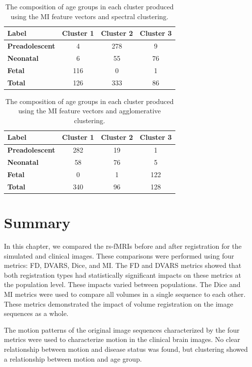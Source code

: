 \begin{table}
\centering
\caption{The composition of age groups in each cluster produced using the MI feature vectors and spectral clustering.}
\label{tab:mocha-mi-spectral}
\begin{tabular}{|l|c|c|c|}
\hline
\textbf{Label} & \multicolumn{1}{l|}{\textbf{Cluster 1}} & \multicolumn{1}{l|}{\textbf{Cluster 2}} & \multicolumn{1}{l|}{\textbf{Cluster 3}} \\ \hline
\textbf{Preadolescent} &   4 & 278 &  9 \\ \hline
\textbf{Neonatal}      &   6 &  55 & 76 \\ \hline
\textbf{Fetal}         & 116 &   0 &  1 \\ \hline
\textbf{Total}         & 126 & 333 & 86 \\ \hline
\end{tabular}
\end{table}

\begin{table}
\centering
\caption{The composition of age groups in each cluster produced using the MI feature vectors and agglomerative clustering.}
\label{tab:mocha-mi-agg}
\begin{tabular}{|l|c|c|c|}
\hline
\textbf{Label} & \multicolumn{1}{l|}{\textbf{Cluster 1}} & \multicolumn{1}{l|}{\textbf{Cluster 2}} & \multicolumn{1}{l|}{\textbf{Cluster 3}} \\ \hline
\textbf{Preadolescent} & 282 & 19 & 1   \\ \hline
\textbf{Neonatal}      & 58  & 76 & 5   \\ \hline
\textbf{Fetal}         & 0   & 1  & 122 \\ \hline
\textbf{Total}         & 340 & 96 & 128 \\ \hline
\end{tabular}
\end{table}

\clearpage

\section{Summary}

In this chapter, we compared the rs-fMRIs before and after registration for the simulated and clinical images. These comparisons were performed using four metrics: FD, DVARS, Dice, and MI. The FD and DVARS metrics showed that both registration types had statistically significant impacts on these metrics at the population level. These impacts varied between populations. The Dice and MI metrics were used to compare all volumes in a single sequence to each other. These metrics demonstrated the impact of volume registration on the image sequences as a whole. 

The motion patterns of the original image sequences characterized by the four metrics were used to characterize motion in the clinical brain images. No clear relationship between motion and disease status was found, but clustering showed a relationship between motion and age group.